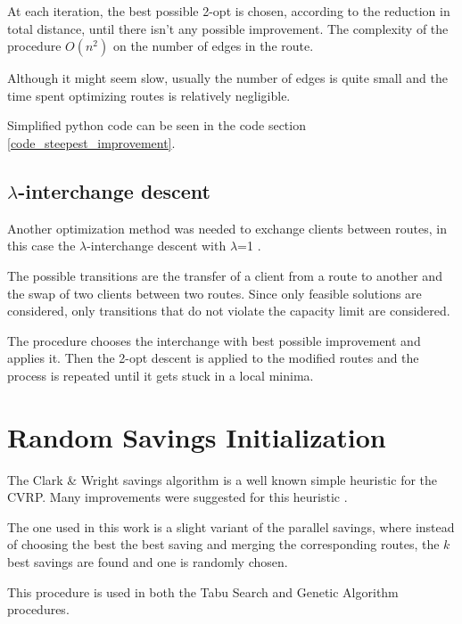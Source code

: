 \documentclass{article} %
\begin{document}
At each iteration, the best possible 2-opt is chosen, according to the reduction in total distance, until there isn't any possible improvement. The complexity of the procedure $O(n^{2})$ on the number of edges in the route.\newline

Although it might seem slow, usually the number of edges is quite small and the time spent optimizing routes is relatively negligible.\newline

Simplified python code can be seen in the code section \ref{code_steepest_improvement}.


\subsection{$\lambda$-interchange descent}
Another optimization method was needed to exchange clients between routes, in this case the $\lambda$-interchange descent with $\lambda$=1 \citep{osman1993}.\newline

The possible transitions are the transfer of a client from a route to another and the swap of two clients between two routes. Since only feasible solutions are considered, only transitions that do not violate the capacity limit are considered.\newline

The procedure chooses the interchange with best possible improvement and applies it. Then the 2-opt descent is applied to the modified routes and the process is repeated until it gets stuck in a local minima.


\newpage
\section{Random Savings Initialization}

The Clark \& Wright savings algorithm is a well known simple heuristic for the CVRP.
Many improvements were suggested for this heuristic \cite{clark_wright_ds}.\newline

The one used in this work is a slight variant of the parallel savings, where instead of choosing the best the best saving and merging the corresponding routes, the $k$ best savings are found and one is randomly chosen.\newline

This procedure is used in both the Tabu Search and Genetic Algorithm procedures.\newline
\end{document}
